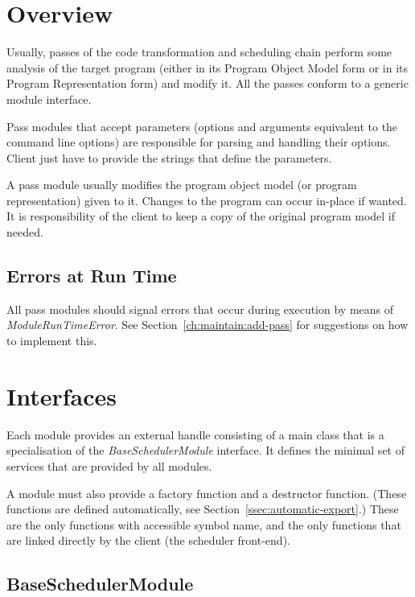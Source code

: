 \documentclass[a4paper,twoside]{tce}
\begin{document}
\section{Overview}

Usually, passes of the code transformation and scheduling chain perform some
analysis of the target program (either in its Program Object Model form or
in its Program Representation form) and modify it. All the passes conform to
a generic module interface.

Pass modules that accept parameters (options and arguments equivalent to the
command line options) are responsible for parsing and handling their
options. Client just have to provide the strings that define the parameters.

A pass module usually modifies the program object model (or program
representation) given to it. Changes to the program can occur in-place if
wanted. It is responsibility of the client to keep a copy of the original
program model if needed.

\subsection{Errors at Run Time}

All pass modules should signal errors that occur during execution by means
of \emph{ModuleRunTimeError}. See Section~\ref{ch:maintain:add-pass} for
suggestions on how to implement this.

\section{Interfaces}

Each module provides an external handle consisting of a main class that is a
specialisation of the \emph{BaseSchedulerModule} interface. It defines the
minimal set of services that are provided by all modules.

A module must also provide a factory function and a destructor function.
(These functions are defined automatically, see
Section~\ref{ssec:automatic-export}.) These are the only functions with
accessible symbol name, and the only functions that are linked directly by
the client (the scheduler front-end).

\subsection{BaseSchedulerModule}
\label{ssec:BaseSchedulerModule-if}
\end{document}
